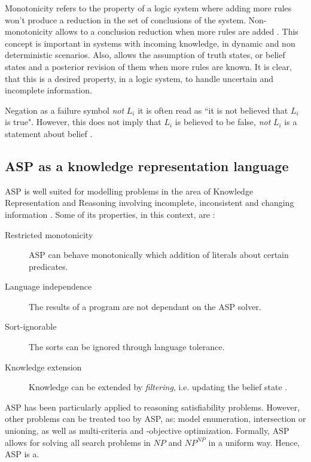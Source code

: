 Monotonicity refers to the property of a logic system where adding more rules won't produce a reduction in the set of conclusions of the system. 
Non-monotonicity allows to a conclusion reduction when more rules are added \citep{Poole2010_AIbook}. 
This concept is important in systems with incoming knowledge, in dynamic and non deterministic scenarios.
Also, allows the assumption of truth states, or belief states and a posterior revision of them when more rules are known.
It is clear, that this is a desired property, in a logic system, to handle uncertain and incomplete information.

Negation as a failure symbol \textit{not} $L_i$ it is often read as ``it is not believed that $L_i$ is true". 
However, this does not imply that $L_i$ is believed to be false, \textit{not} $L_i$ is a statement about belief \citep{Gelfond2014_KRRbook}.

\subsection{ASP as a knowledge representation language}

ASP is well suited for modelling problems in the area of Knowledge Representation and Reasoning involving incomplete, inconsistent and changing information \citep{Schaub13_ASPBoCo}. Some of its properties, in this context, are \citep{Todorova2006_CKASP}:

\begin{description}
\item[Restricted monotonicity] ASP can behave monotonically which addition of literals about certain predicates.
\item[Language independence] The results of a program are not dependant on the ASP solver.
\item[Sort-ignorable] The sorts can be ignored through language tolerance. %
\item[Knowledge extension] Knowledge can be extended by \textit{filtering}, i.e. updating the belief state \citep{Amir2003_LogFil}.
\end{description}

ASP has been particularly applied to reasoning satisfiability problems.
However, other problems can be treated too by ASP, as: model enumeration, intersection or unioning, as well as multi-criteria and -objective optimization. 
Formally, ASP allows for solving all search problems in $NP$ and $NP^{NP}$ in a uniform way. 
Hence, ASP is a\citep{Schaub13_ASPBoCo}.

